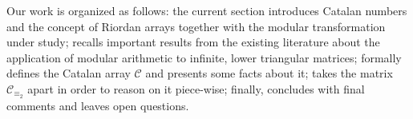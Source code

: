 


Our work is organized as follows: the current section introduces Catalan
numbers and the concept of Riordan arrays together with the modular
transformation under study;  recalls important results
from the existing literature about the application of modular arithmetic to
infinite, lower triangular matrices;  formally defines
the Catalan array $\mathcal{C}$ and presents some facts about it;
 takes the matrix $\mathcal{C}_{\equiv_{2}}$
apart in order to reason on it piece-wise; finally, 
concludes with final comments and leaves open questions.

